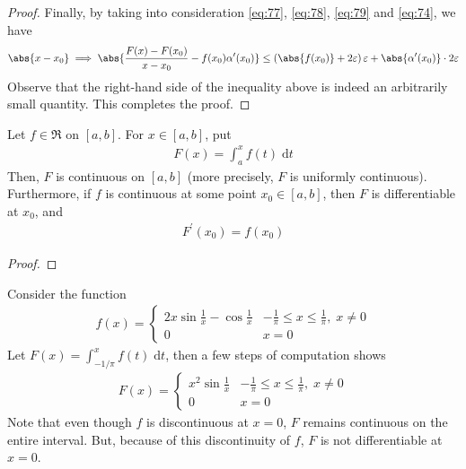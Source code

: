 \documentclass[thmcnt=section, 12pt]{elegantbook}
\begin{document}
\begin{proof}
    \par Finally, by taking into consideration \eqref{eq:77}, \eqref{eq:78}, \eqref{eq:79} and \eqref{eq:74}, we have 
    \begin{align*}
        \abs{x - x_0}
        \implies
        \abs{
            \frac{F(x) - F(x_0)}{x - x_0}
            - f(x_0) \alpha^\prime(x_0)
        } \leq \left( \abs{f(x_0)} + 2\varepsilon \right) \varepsilon + \abs{\alpha^\prime(x_0)} \cdot 2\varepsilon
    \end{align*}
    Observe that the right-hand side of the inequality above is indeed an arbitrarily small quantity. This completes the proof.
\end{proof}


\begin{theorem} \label{thm:3}
    Let $f \in \mathfrak{R}$ on $[a, b]$. For $x \in [a, b]$, put 
    \begin{align*}
        F(x) = \int_a^x f(t) \; \mathrm{d} t
    \end{align*}
    Then, $F$ is continuous on $[a, b]$ (more precisely, $F$  is uniformly continuous). Furthermore, if $f$ is continuous at some point $x_0 \in [a, b]$, then $F$ is differentiable at $x_0$, and 
    \begin{align*}
        F^\prime(x_0) = f(x_0)
    \end{align*}
\end{theorem}

\begin{proof}
\end{proof}

\begin{example}
    Consider the function 
    \begin{align*}
        f(x) = \begin{cases}
            2x \sin \frac{1}{x} - \cos \frac{1}{x} &-\frac{1}{\pi} \leq x \leq \frac{1}{\pi}, \; x \neq 0 \\ 
            0 &x = 0
        \end{cases}
    \end{align*}
    Let $F(x) = \int_{-1/\pi}^{x} f(t) \; \mathrm{d} t$, then a few steps of computation shows 
    \begin{align*}
        F(x) = \begin{cases}
            x^2 \sin \frac{1}{x}  &-\frac{1}{\pi} \leq x \leq \frac{1}{\pi}, \; x \neq 0 \\ 
            0 &x = 0
        \end{cases}
    \end{align*}
    Note that even though $f$ is discontinuous at $x = 0$, $F$ remains continuous on the entire interval. But, because of this discontinuity of $f$,  $F$ is not differentiable at $x=0$.
\end{example}
\end{document}
